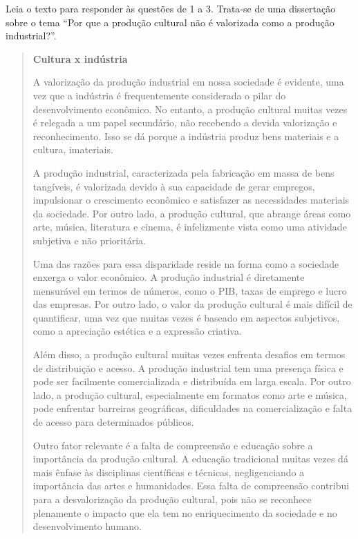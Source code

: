 
Leia o texto para responder às questões de 1 a 3. Trata-se de uma
dissertação sobre o tema ``Por que a produção cultural não é valorizada
como a produção industrial?''.

\begin{quote}
\textbf{Cultura x indústria}


A valorização da produção industrial em nossa sociedade é evidente, uma
vez que a indústria é frequentemente considerada o pilar do
desenvolvimento econômico. No entanto, a produção cultural muitas vezes
é relegada a um papel secundário, não recebendo a devida valorização e
reconhecimento. Isso se dá porque a indústria produz bens materiais e a
cultura, imateriais.

A produção industrial, caracterizada pela fabricação em massa de bens
tangíveis, é valorizada devido à sua capacidade de gerar empregos,
impulsionar o crescimento econômico e satisfazer as necessidades
materiais da sociedade. Por outro lado, a produção cultural, que abrange
áreas como arte, música, literatura e cinema, é infelizmente vista como
uma atividade subjetiva e não prioritária.

Uma das razões para essa disparidade reside na forma como a sociedade
enxerga o valor econômico. A produção industrial é diretamente
mensurável em termos de números, como o PIB, taxas de emprego e lucro
das empresas. Por outro lado, o valor da produção cultural é mais
difícil de quantificar, uma vez que muitas vezes é baseado em aspectos
subjetivos, como a apreciação estética e a expressão criativa.

Além disso, a produção cultural muitas vezes enfrenta desafios em termos
de distribuição e acesso. A produção industrial tem uma presença física
e pode ser facilmente comercializada e distribuída em larga escala. Por
outro lado, a produção cultural, especialmente em formatos como arte e
música, pode enfrentar barreiras geográficas, dificuldades na
comercialização e falta de acesso para determinados públicos.

Outro fator relevante é a falta de compreensão e educação sobre a
importância da produção cultural. A educação tradicional muitas vezes dá
mais ênfase às disciplinas científicas e técnicas, negligenciando a
importância das artes e humanidades. Essa falta de compreensão contribui
para a desvalorização da produção cultural, pois não se reconhece
plenamente o impacto que ela tem no enriquecimento da sociedade e no
desenvolvimento humano.


\end{quote}
